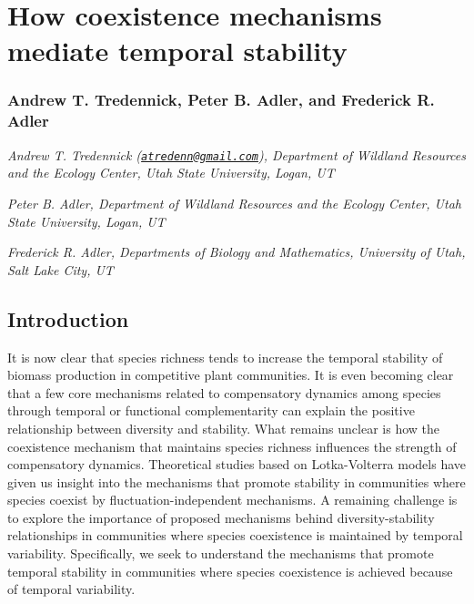 \documentclass[12pt,]{article}
\title{}
\author{}
\date{}
\begin{document}
\maketitle


\section{How coexistence mechanisms mediate temporal
stability}\label{how-coexistence-mechanisms-mediate-temporal-stability}

\subsubsection{Andrew T. Tredennick, Peter B. Adler, and Frederick R.
Adler}\label{andrew-t.-tredennick-peter-b.-adler-and-frederick-r.-adler}

\emph{Andrew T. Tredennick
(\href{mailto:atredenn@gmail.com}{\href{mailto:atredenn@gmail.com}{\nolinkurl{atredenn@gmail.com}}}),
Department of Wildland Resources and the Ecology Center, Utah State
University, Logan, UT}

\emph{Peter B. Adler, Department of Wildland Resources and the Ecology
Center, Utah State University, Logan, UT}

\emph{Frederick R. Adler, Departments of Biology and Mathematics,
University of Utah, Salt Lake City, UT}

\subsection{Introduction}\label{introduction}

It is now clear that species richness tends to increase the temporal
stability of biomass production in competitive plant communities. It is
even becoming clear that a few core mechanisms related to compensatory
dynamics among species through temporal or functional complementarity
can explain the positive relationship between diversity and stability.
What remains unclear is how the coexistence mechanism that maintains
species richness influences the strength of compensatory dynamics.
Theoretical studies based on Lotka-Volterra models have given us insight
into the mechanisms that promote stability in communities where species
coexist by fluctuation-independent mechanisms. A remaining challenge is
to explore the importance of proposed mechanisms behind
diversity-stability relationships in communities where species
coexistence is maintained by temporal variability. Specifically, we seek
to understand the mechanisms that promote temporal stability in
communities where species coexistence is achieved because of temporal
variability.
\end{document}
